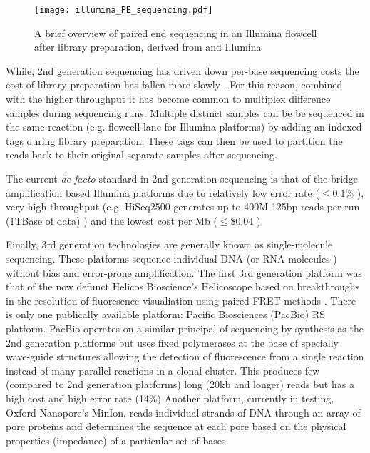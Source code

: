 \begin{figure}
    \texttt{[image: illumina\_PE\_sequencing.pdf]}
    \label{fig:libseq}
    \caption[Paired-end Sequencing]{A brief overview of paired end sequencing in an Illumina flowcell after library preparation, derived
    from \citep{Mardis2008} and Illumina}
\end{figure}

While, 2nd generation sequencing has driven down per-base sequencing costs the cost of library preparation 
has fallen more slowly \citep{Blainey2013}.
For this reason, combined with the higher throughput it has become common to multiplex difference samples 
during sequencing runs.  Multiple distinct samples can be be sequenced
in the same reaction (e.g. flowcell lane for Illumina platforms) by adding an indexed tags during library
preparation.  These tags can then be used to partition the reads back to their original separate samples
after sequencing. 

The current \textit{de facto} standard in 2nd generation sequencing is that of the bridge amplification
based \citep{Shendure2008} Illumina platforms \citep{Regalado2014} due to relatively low error rate (\(\leq0.1\%\) \citep{Glenn2011}),
very high throughput (e.g. HiSeq2500 generates up to 400M 125bp reads per run (1TBase of data) \citep{Nederbragt2013})
and the lowest cost per Mb (\(\leq\$0.04\) \citep{Glenn2011}).


Finally, 3rd generation technologies are generally known as single-molecule sequencing.
These platforms sequence individual DNA (or RNA molecules \citep{Ozsolak2009}) without
bias and error-prone amplification. 
The first 3rd generation platform was that of the now defunct Helicos Bioscience's Helicoscope \citep{Harris2008}
based on breakthroughs in the resolution of fluoresence visualiation using paired FRET methods \citep{Braslavsky2003}.
There is only one publically available platform: Pacific Biosciences (PacBio) RS platform. PacBio operates on a similar principal
of sequencing-by-synthesis as the 2nd generation platforms but uses fixed polymerases at the base
of specially wave-guide structures allowing the detection of fluorescence from a single reaction
instead of many parallel reactions in a clonal cluster.  This produces few (compared to 2nd generation 
platforms) long (20kb and longer) reads but has a high cost and high error rate (14\%) \citep{Jaszczyszyn2014}
Another platform, currently in testing, Oxford Nanopore's MinIon, reads individual strands of DNA through an array of 
pore proteins and determines the sequence at each pore based on the physical
properties (impedance) of a particular set of bases.


